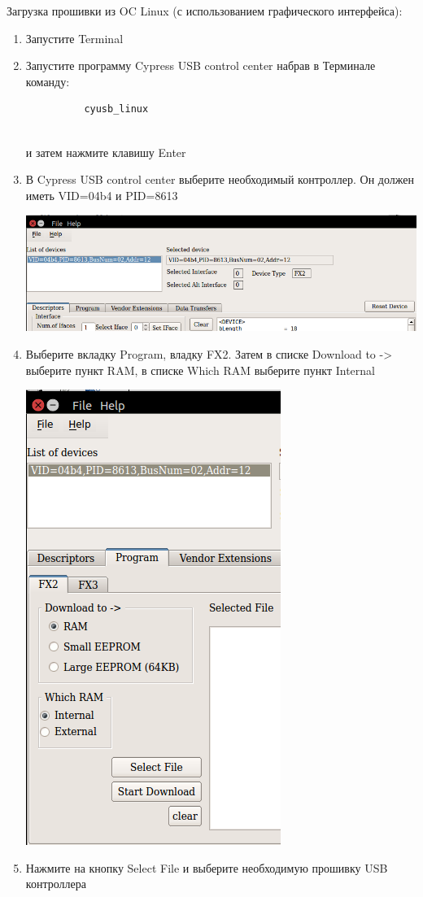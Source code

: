 \documentclass[]{article}
\begin{document}
Загрузка прошивки из OC Linux (с использованием графического
интерфейса):

\begin{enumerate}
\def\labelenumi{\arabic{enumi}.}
\item
  Запустите Terminal
\item
  Запустите программу Cypress USB control center набрав в Терминале
  команду:

\begin{verbatim}
          cyusb_linux
        
\end{verbatim}

  и затем нажмите клавишу Enter
\item
  В Cypress USB control center выберите необходимый контроллер. Он
  должен иметь VID=04b4 и PID=8613

  \includegraphics{./imgs/firmware_USB_lin_Select_controller.png}
\item
  Выберите вкладку Program, владку FX2. Затем в списке Download to
  -\textgreater{} выберите пункт RAM, в списке Which RAM выберите пункт
  Internal

  \includegraphics{./imgs/firmware_USB_lin_Select_RAM.png}
\item
  Нажмите на кнопку Select File и выберите необходимую прошивку USB
  контроллера


\end{enumerate}
\end{document}
